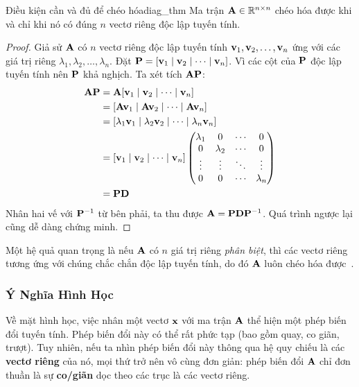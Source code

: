 \begin{mythm}{Điều kiện cần và đủ để chéo hóa}{diag_thm}
Ma trận $\mathbf{A} \in \mathbb{R}^{n \times n}$ chéo hóa được khi và chỉ khi nó có đúng $n$ vectơ riêng độc lập tuyến tính.
\end{mythm}

\begin{proof}
Giả sử $\mathbf{A}$ có $n$ vectơ riêng độc lập tuyến tính $\mathbf{v}_1, \mathbf{v}_2, \ldots, \mathbf{v}_n$ ứng với các giá trị riêng $\lambda_1, \lambda_2, \ldots, \lambda_n$. Đặt $\mathbf{P} = [\mathbf{v}_1 \mid \mathbf{v}_2 \mid \cdots \mid \mathbf{v}_n]$. Vì các cột của $\mathbf{P}$ độc lập tuyến tính nên $\mathbf{P}$ khả nghịch. Ta xét tích $\mathbf{A}\mathbf{P}$:
\begin{align*}
    \mathbf{A}\mathbf{P} &= \mathbf{A}[\mathbf{v}_1 \mid \mathbf{v}_2 \mid \cdots \mid \mathbf{v}_n] \\
    &= [\mathbf{A}\mathbf{v}_1 \mid \mathbf{A}\mathbf{v}_2 \mid \cdots \mid \mathbf{A}\mathbf{v}_n] \\
    &= [\lambda_1\mathbf{v}_1 \mid \lambda_2\mathbf{v}_2 \mid \cdots \mid \lambda_n\mathbf{v}_n] \\
    &= [\mathbf{v}_1 \mid \mathbf{v}_2 \mid \cdots \mid \mathbf{v}_n] 
    \begin{pmatrix}
        \lambda_1 & 0 & \cdots & 0 \\
        0 & \lambda_2 & \cdots & 0 \\
        \vdots & \vdots & \ddots & \vdots \\
        0 & 0 & \cdots & \lambda_n
    \end{pmatrix} \\
    &= \mathbf{P}\mathbf{D}
\end{align*}
Nhân hai vế với $\mathbf{P}^{-1}$ từ bên phải, ta thu được $\mathbf{A} = \mathbf{P}\mathbf{D}\mathbf{P}^{-1}$. Quá trình ngược lại cũng dễ dàng chứng minh.
\end{proof}

Một hệ quả quan trọng là nếu $\mathbf{A}$ có $n$ giá trị riêng \emph{phân biệt}, thì các vectơ riêng tương ứng với chúng chắc chắn độc lập tuyến tính, do đó $\mathbf{A}$ luôn chéo hóa được~\cite{strang2023}.

\subsubsection{Ý Nghĩa Hình Học}

Về mặt hình học, việc nhân một vectơ $\mathbf{x}$ với ma trận $\mathbf{A}$ thể hiện một phép biến đổi tuyến tính. Phép biến đổi này có thể rất phức tạp (bao gồm quay, co giãn, trượt). Tuy nhiên, nếu ta nhìn phép biến đổi này thông qua hệ quy chiếu là các \textbf{vectơ riêng} của nó, mọi thứ trở nên vô cùng đơn giản: phép biến đổi $\mathbf{A}$ chỉ đơn thuần là sự \textbf{co/giãn} dọc theo các trục là các vectơ riêng.

